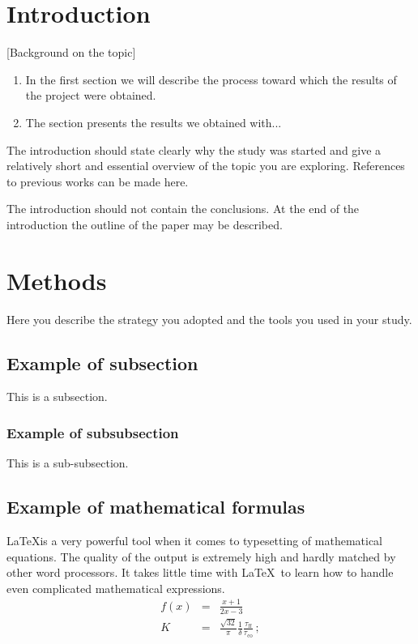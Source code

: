 \documentclass[letterpaper,12pt]{article}
\begin{document}


\section{Introduction}
[Background on the topic]

\begin{enumerate}
\item In the first section we will describe the process toward which the results of the project were obtained.
\item The section presents the results we obtained with...
\end{enumerate}

The introduction should state clearly why the study was started
and give a relatively short and essential overview of the topic
you are exploring. References to previous works can be made here.
 
The introduction should not contain the conclusions. 
At the end of the introduction the outline of the paper may be described.
 
 
\section{Methods}
Here you describe the strategy you adopted and the tools you
used in your study.
\subsection{Example of subsection}
This is a subsection.
\subsubsection{Example of subsubsection}
This is a sub-subsection.

\subsection{Example of mathematical formulas}
\LaTeX is a very powerful tool when it comes to typesetting of
mathematical equations. The quality of the output is extremely
high and hardly matched by other word processors. It takes little
time with {\LaTeX\,}  to learn how to handle 
even complicated mathematical expressions.
   \begin{eqnarray}
       f(x)& = & \frac{x + 1}{2x-3}\\
      K        & = & \frac{\sqrt{32}}{\pi} \frac{1}{\delta}
                        \frac{ \tau_{\mathrm{ff}} }
                             { \tau_{\mathrm{co}} } \nonumber \,;
   \end{eqnarray}
\end{document}
